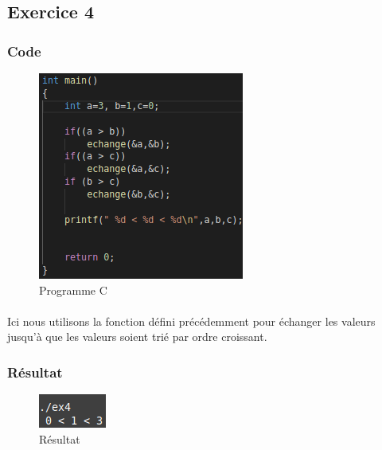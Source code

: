 \documentclass[10pt,a4paper]{article}
\begin{document}
\pagebreak
\subsection{Exercice 4}
\subsubsection{Code}
\begin{figure}[h]
\begin{center}
\includegraphics[scale=.3]{images/ex4_c}
\end{center}
\caption{Programme C}
\end{figure}
\paragraph{}
Ici nous utilisons la fonction défini précédemment pour échanger les valeurs jusqu'à que les valeurs soient trié par ordre croissant.
\subsubsection{Résultat}
\begin{figure}[h] 
\begin{center}
\includegraphics[scale=.3]{images/ex4_ex}
\end{center}
\caption{Résultat}
\end{figure}
\end{document}

